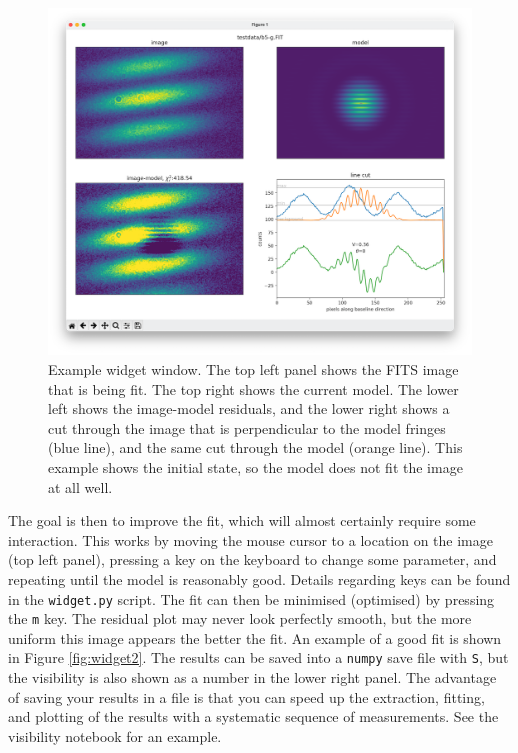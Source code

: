 \documentclass[11pt]{article}
\begin{document}
\begin{figure}[h!]
    \centering
    \includegraphics[width=1\textwidth]{widget.png}
    \caption{Example widget window. The top left panel shows the FITS image that is being fit. The top right shows the current model. The lower left shows the image-model residuals, and the lower right shows a cut through the image that is perpendicular to the model fringes (blue line), and the same cut through the model (orange line). This example shows the initial state, so the model does not fit the image at all well.}
    \label{fig:widget}
\end{figure}

The goal is then to improve the fit, which will almost certainly require some interaction. This works by moving the mouse cursor to a location on the image (top left panel), pressing a key on the keyboard to change some parameter, and repeating until the model is reasonably good. Details regarding keys can be found in the \texttt{widget.py} script. The fit can then be minimised (optimised) by pressing the \texttt{m} key. The residual plot may never look perfectly smooth, but the more uniform this image appears the better the fit. An example of a good fit is shown in Figure \ref{fig:widget2}. The results can be saved into a \texttt{numpy} save file with \texttt{S}, but the visibility is also shown as a number in the lower right panel. The advantage of saving your results in a file is that you can speed up the extraction, fitting, and plotting of the results with a systematic sequence of measurements. See the visibility notebook for an example.
\end{document}
